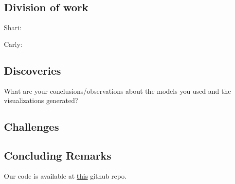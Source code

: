 \subsection{Division of work}
Shari:

Carly:

\subsection{Discoveries}
What are your conclusions/observations about the models you used and the visualizations generated?

\subsection{Challenges}



\subsection{Concluding Remarks}

Our code is available at \href{https://github.com/carlyrobison/MovieLensVis/}{this} github repo.







